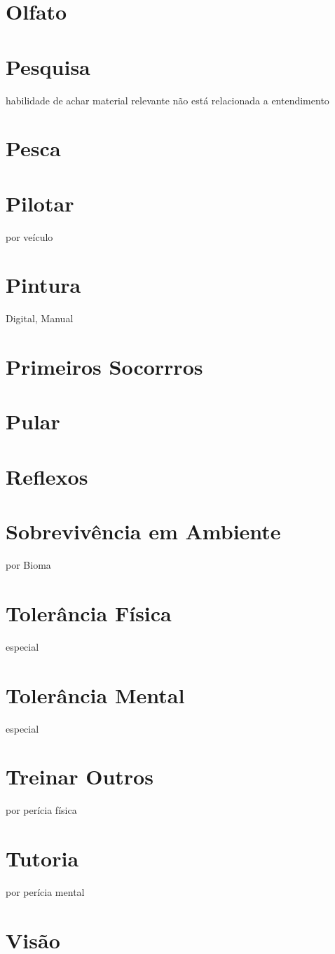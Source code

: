 \section{Olfato}
\section{Pesquisa} habilidade de achar material relevante não está relacionada a entendimento
\section{Pesca}
\section{Pilotar} por veículo
\section{Pintura} Digital, Manual
\section{Primeiros Socorrros}
\section{Pular}
\section{Reflexos}
\section{Sobrevivência em Ambiente} por Bioma
\section{Tolerância Física} especial
\section{Tolerância Mental} especial
\section{Treinar Outros} por perícia física
\section{Tutoria} por perícia mental
\section{Visão}
%
%
%
%
%
%
%
%
%
%
